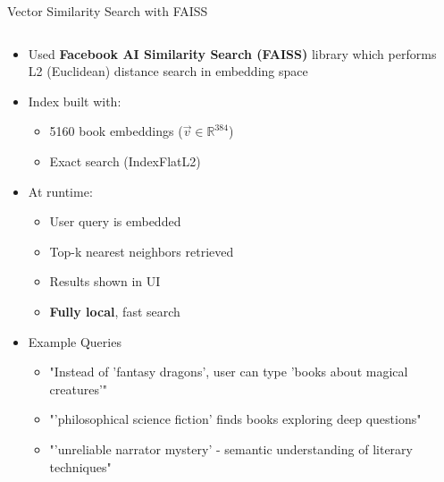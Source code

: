 \begin{frame}{Vector Similarity Search with FAISS}

\begin{columns}[T]
  \begin{column}{0.55\textwidth}
    \begin{itemize}
        \item Used \textbf{Facebook AI Similarity Search (FAISS)} library which performs L2 (Euclidean) distance search in embedding space
        \item Index built with:
          \begin{itemize}
            \item 5160 book embeddings (\( \vec{v} \in \mathbb{R}^{384} \))
            \item Exact search (IndexFlatL2)
          \end{itemize}
        \item At runtime:
          \begin{itemize}
            \item User query is embedded
            \item Top-k nearest neighbors retrieved
            \item Results shown in UI
            \item \textbf{Fully local}, fast search
          \end{itemize}
        \item Example Queries
          \begin{itemize}
            \item "Instead of 'fantasy dragons', user can type 'books about magical creatures'"
            \item "'philosophical science fiction' finds books exploring deep questions"
            \item "'unreliable narrator mystery' - semantic understanding of literary techniques"
          \end{itemize}
    \end{itemize}
  \end{column}

  \begin{column}{0.40\textwidth}
    \centering
\end{column}
\end{columns}
\end{frame}
